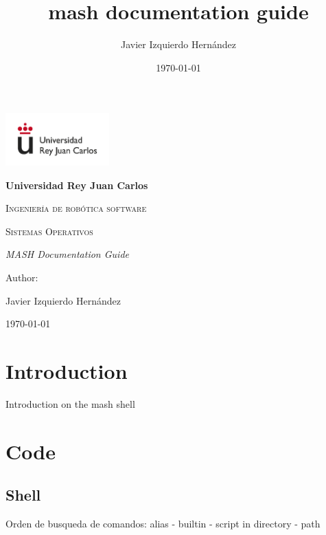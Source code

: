 \documentclass[12pt,a4paper]{report}
\title{mash documentation guide}
\author{Javier Izquierdo Hernández}
\date{\today}
\begin{document}
	\begin{titlepage}
		\centering
		{\includegraphics[width=0.3\textwidth]{logo}\par}
		\vspace{1cm}
		{\bfseries\LARGE Universidad Rey Juan Carlos \par}
		\vspace{1cm}
		{\scshape\Large Ingeniería de robótica software \par}
		\vspace{3cm}
		{\scshape\Huge Sistemas Operativos \par}
		\vspace{3cm}
		{\itshape\Large MASH Documentation Guide \par}
		\vfill
		{\Large Author: \par}
		{\Large Javier Izquierdo Hernández \par}
		\vfill
		{\Large \today \par}
	\end{titlepage}
	\newpage
	\tableofcontents
	\newpage
\part{Introduction}
Introduction on the mash shell
\part{Code}
\chapter{Shell}
Orden de busqueda de comandos: alias - builtin - script in directory - path
\end{document}
